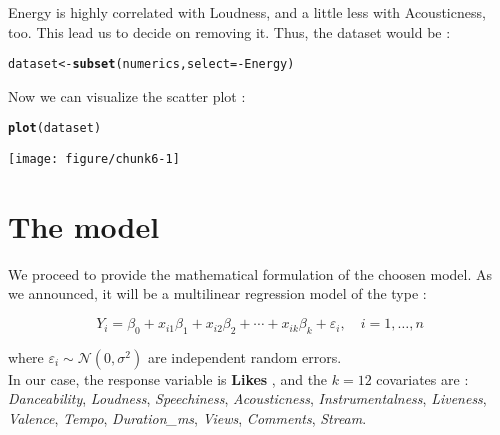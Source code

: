 \documentclass[11pt]{article}\usepackage[]{graphicx}\usepackage[]{xcolor}
\makeatletter
\newcommand{\hlopt}[1]{\textcolor[rgb]{0,0,0}{#1}}%
\newcommand{\hldef}[1]{\textcolor[rgb]{0.345,0.345,0.345}{#1}}%
\newcommand{\hlkwb}[1]{\textcolor[rgb]{0.69,0.353,0.396}{#1}}%
\newcommand{\hlkwc}[1]{\textcolor[rgb]{0.333,0.667,0.333}{#1}}%
\newcommand{\hlkwd}[1]{\textcolor[rgb]{0.737,0.353,0.396}{\textbf{#1}}}%
\newenvironment{kframe}{%
 \def\at@end@of@kframe{}%
 \ifinner\ifhmode%
  \def\at@end@of@kframe{\end{minipage}}%
  \begin{minipage}{\columnwidth}%
 \fi\fi%
 \def\FrameCommand##1{\hskip\@totalleftmargin \hskip-\fboxsep
 \colorbox{shadecolor}{##1}\hskip-\fboxsep
     \hskip-\linewidth \hskip-\@totalleftmargin \hskip\columnwidth}%
 \MakeFramed {\advance\hsize-\width
   \@totalleftmargin\z@ \linewidth\hsize
   \@setminipage}}%
 {\par\unskip\endMakeFramed%
 \at@end@of@kframe}
\newenvironment{knitrout}{}{} %
\makeatother
\begin{document}
Energy is highly correlated with Loudness, and a little less with Acousticness, too. This lead us to decide on removing it. Thus, the dataset would be :
\begin{knitrout}
\color{fgcolor}\begin{kframe}
\begin{alltt}
\hldef{dataset}\hlkwb{<-} \hlkwd{subset}\hldef{(numerics,} \hlkwc{select} \hldef{=} \hlopt{-}\hldef{Energy)}
\end{alltt}
\end{kframe}
\end{knitrout}


Now we can visualize the scatter plot :
\begin{knitrout}
\color{fgcolor}\begin{kframe}
\begin{alltt}
\hlkwd{plot}\hldef{(dataset)}
\end{alltt}
\end{kframe}

{\centering \texttt{[image: figure/chunk6-1]} 

}


\end{knitrout}


\newpage
\section{The model}

We proceed to provide the mathematical formulation of the choosen model. As we announced, it will be a multilinear regression model of the type : 

\begin{equation}
Y_i = \beta_0 + x_{i1}\beta_1 + x_{i2}\beta_2 + \cdots + x_{ik}\beta_k + \varepsilon_i, \quad i = 1, \dots, n
\end{equation}

where $\varepsilon_i \sim \mathcal{N}(0, \sigma^2)$ are independent random errors. \\
In our case, the response variable is \textbf{Likes} , and the $k = 12$ covariates are : \textit{Danceability}, \textit{Loudness}, \textit{Speechiness}, \textit{Acousticness}, \textit{Instrumentalness}, \textit{Liveness}, \textit{Valence}, \textit{Tempo}, \textit{Duration\_ms}, \textit{Views}, \textit{Comments}, \textit{Stream}. 
\end{document}
